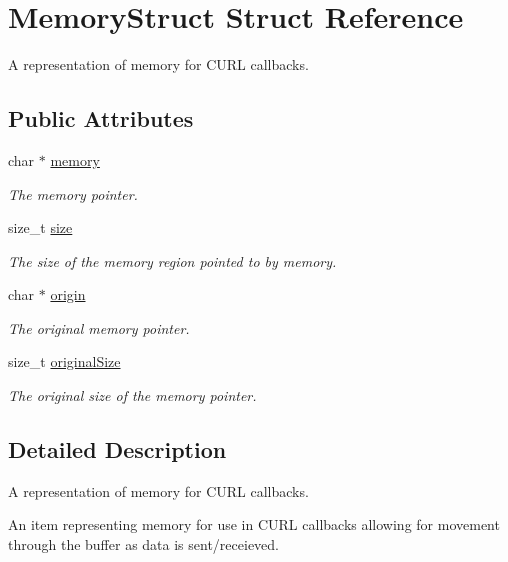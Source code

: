 \hypertarget{structMemoryStruct}{}\section{Memory\+Struct Struct Reference}
\label{structMemoryStruct}


A representation of memory for C\+U\+RL callbacks.  


\subsection*{Public Attributes}
\begin{DoxyCompactItemize}
\item 
char $\ast$ \hyperlink{structMemoryStruct_a218a6fde0f367d44400542cbe523e943}{memory}
\begin{DoxyCompactList}\small\item\em The memory pointer. \end{DoxyCompactList}\item 
size\+\_\+t \hyperlink{structMemoryStruct_a79d6a7ad34b172f766c19d0846688440}{size}
\begin{DoxyCompactList}\small\item\em The size of the memory region pointed to by memory. \end{DoxyCompactList}\item 
char $\ast$ \hyperlink{structMemoryStruct_aaad2180b9716f5bf623bf8275f473a95}{origin}
\begin{DoxyCompactList}\small\item\em The original memory pointer. \end{DoxyCompactList}\item 
size\+\_\+t \hyperlink{structMemoryStruct_a1b96a64b16fc89c7ae010dee990a9bb8}{original\+Size}
\begin{DoxyCompactList}\small\item\em The original size of the memory pointer. \end{DoxyCompactList}\end{DoxyCompactItemize}


\subsection{Detailed Description}
A representation of memory for C\+U\+RL callbacks. 

An item representing memory for use in C\+U\+RL callbacks allowing for movement through the buffer as data is sent/receieved. 

